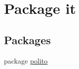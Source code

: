 \hypertarget{namespaceit}{}\section{Package it}
\label{namespaceit}
\subsection*{Packages}
\begin{DoxyCompactItemize}
\item 
package \hyperlink{namespaceit_1_1polito}{polito}
\end{DoxyCompactItemize}
